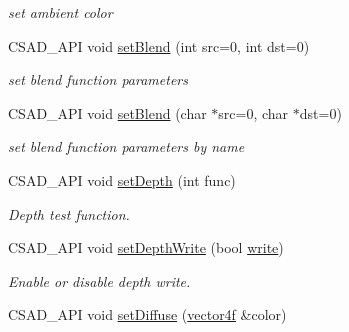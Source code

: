 \begin{DoxyCompactItemize}
\begin{DoxyCompactList}\small\item\em set ambient color \end{DoxyCompactList}\item 
\hypertarget{classcsad_1_1_material_a11344c6e5f8d9c76c2cad2097e3bb64a}{C\-S\-A\-D\-\_\-\-A\-P\-I void \hyperlink{classcsad_1_1_material_a11344c6e5f8d9c76c2cad2097e3bb64a}{set\-Blend} (int src=0, int dst=0)}\label{classcsad_1_1_material_a11344c6e5f8d9c76c2cad2097e3bb64a}

\begin{DoxyCompactList}\small\item\em set blend function parameters \end{DoxyCompactList}\item 
\hypertarget{classcsad_1_1_material_aeb022f5dfdf05f54b1ba928844d40d2f}{C\-S\-A\-D\-\_\-\-A\-P\-I void \hyperlink{classcsad_1_1_material_aeb022f5dfdf05f54b1ba928844d40d2f}{set\-Blend} (char $\ast$src=0, char $\ast$dst=0)}\label{classcsad_1_1_material_aeb022f5dfdf05f54b1ba928844d40d2f}

\begin{DoxyCompactList}\small\item\em set blend function parameters by name \end{DoxyCompactList}\item 
\hypertarget{classcsad_1_1_material_ac0016039da7c346bfbae8c6e6bf41932}{C\-S\-A\-D\-\_\-\-A\-P\-I void \hyperlink{classcsad_1_1_material_ac0016039da7c346bfbae8c6e6bf41932}{set\-Depth} (int func)}\label{classcsad_1_1_material_ac0016039da7c346bfbae8c6e6bf41932}

\begin{DoxyCompactList}\small\item\em Depth test function. \end{DoxyCompactList}\item 
\hypertarget{classcsad_1_1_material_a70f19ccf1cd351c42e4c500bcbc4efe1}{C\-S\-A\-D\-\_\-\-A\-P\-I void \hyperlink{classcsad_1_1_material_a70f19ccf1cd351c42e4c500bcbc4efe1}{set\-Depth\-Write} (bool \hyperlink{classcsad_1_1_base_object_a588a28a35b2aefa0a833405f152d73e4}{write})}\label{classcsad_1_1_material_a70f19ccf1cd351c42e4c500bcbc4efe1}

\begin{DoxyCompactList}\small\item\em Enable or disable depth write. \end{DoxyCompactList}\item 
\hypertarget{classcsad_1_1_material_ab5d322bd830b4adf42acdf663accc544}{C\-S\-A\-D\-\_\-\-A\-P\-I void \hyperlink{classcsad_1_1_material_ab5d322bd830b4adf42acdf663accc544}{set\-Diffuse} (\hyperlink{classbt_1_1vector4f}{vector4f} \&color)}\label{classcsad_1_1_material_ab5d322bd830b4adf42acdf663accc544}


\end{DoxyCompactItemize}
